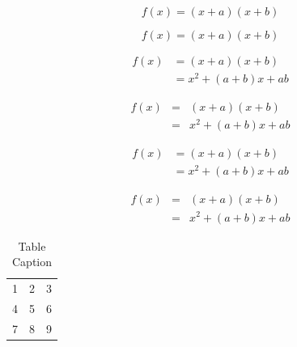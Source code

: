 \documentclass[5p]{elsarticle}
\begin{document}
\begin{equation}
f(x) = (x+a)(x+b)
\end{equation}

\begin{equation*}
f(x) = (x+a)(x+b)
\end{equation*}

\begin{align}
 f(x) &= (x+a)(x+b) \\
      &= x^2 + (a+b)x + ab
\end{align}

\begin{eqnarray}
 f(x) &=& (x+a)(x+b) \nonumber\\ %
      &=& x^2 + (a+b)x + ab
\end{eqnarray}

\begin{align*}
 f(x) &= (x+a)(x+b) \\
      &= x^2 + (a+b)x + ab
\end{align*}

\begin{eqnarray*}
 f(x)&=& (x+a)(x+b) \\
     &=& x^2 + (a+b)x + ab
\end{eqnarray*}


\begin{table}[t]%
\centering%
\begin{tabular}{l c r}%
  1 & 2 & 3 \\ %
  4 & 5 & 6 \\
  7 & 8 & 9 \\
\end{tabular}
\caption{Table Caption}\label{fig1}
\end{table}
\end{document}
